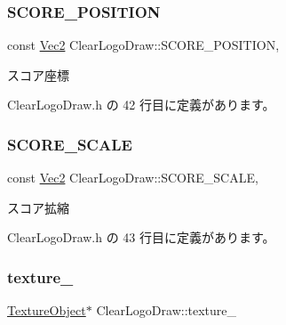 \subsubsection{\texorpdfstring{S\+C\+O\+R\+E\+\_\+\+P\+O\+S\+I\+T\+I\+ON}{SCORE\_POSITION}}
{\footnotesize\ttfamily const \mbox{\hyperlink{_vector3_d_8h_a5ef6e95dfc5f9d3820b71772d99bbc25}{Vec2}} Clear\+Logo\+Draw\+::\+S\+C\+O\+R\+E\+\_\+\+P\+O\+S\+I\+T\+I\+ON\hspace{0.3cm}{\ttfamily [static]}, {\ttfamily [private]}}



スコア座標 



 Clear\+Logo\+Draw.\+h の 42 行目に定義があります。

\mbox{\label{class_clear_logo_draw_a38addcdd1692a417e62453f67c8065f5}} 
\subsubsection{\texorpdfstring{S\+C\+O\+R\+E\+\_\+\+S\+C\+A\+LE}{SCORE\_SCALE}}
{\footnotesize\ttfamily const \mbox{\hyperlink{_vector3_d_8h_a5ef6e95dfc5f9d3820b71772d99bbc25}{Vec2}} Clear\+Logo\+Draw\+::\+S\+C\+O\+R\+E\+\_\+\+S\+C\+A\+LE\hspace{0.3cm}{\ttfamily [static]}, {\ttfamily [private]}}



スコア拡縮 



 Clear\+Logo\+Draw.\+h の 43 行目に定義があります。

\mbox{\label{class_clear_logo_draw_adc0729c654f49a408df7ef53b8db0146}} 
\subsubsection{\texorpdfstring{texture\+\_\+}{texture\_}}
{\footnotesize\ttfamily \mbox{\hyperlink{class_texture_object}{Texture\+Object}}$\ast$ Clear\+Logo\+Draw\+::texture\+\_\+\hspace{0.3cm}{\ttfamily [private]}}



